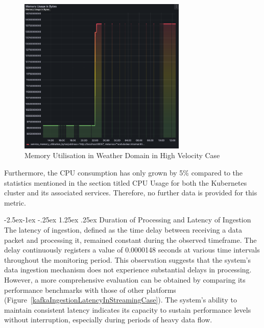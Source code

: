 \documentclass[review]{elsarticle}
\makeatletter
\renewcommand\paragraph{\@startsection{paragraph}{4}{\z@}%
            {-2.5ex\@plus -1ex \@minus -.25ex}%
            {1.25ex \@plus .25ex}%
            {\normalfont\normalsize\itshape}}
\makeatother
\begin{document}
\begin{figure}[h]

  \centering

  \includegraphics[width=8cm]{images/memory-utilization-in-weather-domain-in-streaming-case.png}

  \caption{Memory Utilisation in Weather Domain in High Velocity Case}

  \label{memoryUtilizationInWeatherDomainInHighVelocityCase}

\end{figure}

Furthermore, the CPU consumption has only grown by 5\% compared to the statistics mentioned in the section titled CPU Usage for both the Kubernetes cluster and its associated services. Therefore, no further data is provided for this metric.

\paragraph{Duration of Processing and Latency of Ingestion} The latency of ingestion, defined as the time delay between receiving a data packet and processing it, remained constant during the observed timeframe. The delay continuously registers a value of 0.0000148 seconds at various time intervals throughout the monitoring period. This observation suggests that the system's data ingestion mechanism does not experience substantial delays in processing. However, a more comprehensive evaluation can be obtained by comparing its performance benchmarks with those of other platforms (Figure~\ref{kafkaIngestionLatencyInStreamingCase}). The system's ability to maintain consistent latency indicates its capacity to sustain performance levels without interruption, especially during periods of heavy data flow.
\end{document}
